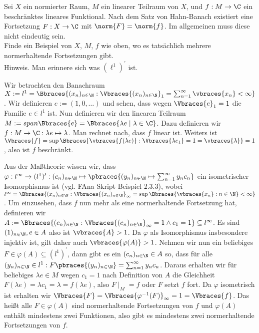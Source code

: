 \begin{exercise}

Sei $X$ ein normierter Raum, $M$ ein linearer Teilraum von $X$, und $f: M \to \C$ ein beschränktes lineares Funktional.
Nach dem Satz von Hahn-Banach existiert eine Fortsetzung $F: X \to \C$ mit $\norm{F} = \norm{f}$.
Im allgemeinen muss diese nicht eindeutig sein. \\

Finde ein Beispiel von $X$, $M$, $f$ wie oben, wo es tatsächlich mehrere normerhaltende Fortsetzungen gibt. \\

Hinweis.
Man erinnere sich was $(\ell^1)^\prime$ ist.

\end{exercise}

\begin{solution}

Wir betrachten den Banachraum $ X := l^1 = \Bbraces{(x_n)_{n \in \N} : \Vbraces{(x_n)_{n \in \N}}_1 = \sum_{n = 1}^\infty \vbraces{x_n} < \infty}$. Wir definieren $e := (1, 0, \dots)$ und sehen, dass wegen $\Vbraces{e}_1 = 1$ die Familie $e \in l^1$ ist. Nun definieren wir den linearen Teilraum $M := span\Bbraces{e} = \Bbraces{\lambda e \mid \lambda \in \C}$. Dazu definieren wir $f: M \to \C: \lambda e \mapsto \lambda$. Man rechnet nach, dass $f$ linear ist. Weiters ist $\Vbraces{f} = \sup\Bbraces{\vbraces{f(\lambda e)} : \Vbraces{\lambda e_1} = 1 = \vbraces{\lambda} } = 1$, also ist $f$ beschränkt.

Aus der Maßtheorie wissen wir, dass $\varphi: l^\infty \to (l^1)^\prime : (c_n)_{n \in \N} \mapsto \pbraces{(y_n)_{n \in \N} \mapsto \sum_{n = 1}^\infty y_n c_n}$ ein isometrischer Isomorphismus ist (vgl. FAna Skript Beispiel 2.3.3), wobei $l^\infty = \Bbraces{(x_n)_{n \in \N}: \Vbraces{(x_n)_{n \in \N}}_\infty = \sup\Bbraces{\vbraces{x_n} : n \in \N} < \infty}$. Um einzusehen, dass $f$ nun mehr als eine normerhaltende Fortsetzung hat, definieren wir \\ $A := \Bbraces{(c_n)_{n \in \N} : \Vbraces{(c_n)_{n \in \N}}_\infty = 1 \land c_1 = 1} \subseteq l^\infty$. Es sind $(1)_{n \in \N}, e \in A$ also ist $\vbraces{A} > 1$. Da $\varphi$ als Isomorphismus insbesondere injektiv ist, gilt daher auch $\vbraces{\varphi(A)} > 1$. Nehmen wir nun ein beliebiges $F \in \varphi(A) \subseteq (l^1)^\prime$, dann gibt es ein $(c_n)_{n \in \N} \in A$ so, dass für alle $(y_n)_{n \in \N} \in l^1: F\pbraces{(y_n)_{n \in \N}} = \sum_{n = 1}^\infty y_n c_n$. Daraus erhalten wir für beliebiges $\lambda e \in M$ wegen $c_1 = 1$ nach Definition von $A$ die Gleichheit $F(\lambda e) = \lambda c_1 = \lambda = f(\lambda e)$, also $F\mid_M = f$ oder $F$ setzt $f$ fort. Da $\varphi$ isometrisch ist erhalten wir $\Vbraces{F} = \Vbraces{\varphi^{-1}(F)}_\infty = 1 = \Vbraces{f}$. Das heißt alle $F \in \varphi(A)$ sind normerhaltende Fortsetzungen von $f$ und $\varphi(A)$ enthält mindestens zwei Funktionen, also gibt es mindestens zwei normerhaltende Fortsetzungen von $f$.

\end{solution}
